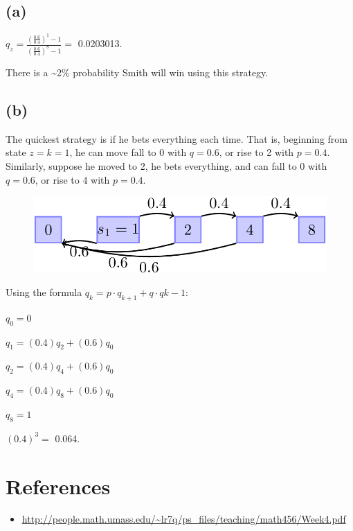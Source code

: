 \documentclass[]{article}
\providecommand{\tightlist}{%
  \setlength{\itemsep}{0pt}\setlength{\parskip}{0pt}}
\begin{document}
\subsection{(a)}\label{a}

\(q_z = \frac{(\frac{0.6}{0.4})^1 - 1}{(\frac{0.6}{0.4})^8 - 1} =\)
0.0203013.

There is a \textasciitilde{}2\% probability Smith will win using this
strategy.

\subsection{(b)}\label{b}

The quickest strategy is if he bets everything each time. That is,
beginning from state \(z = k = 1\), he can move fall to 0 with
\(q = 0.6\), or rise to 2 with \(p = 0.4\). Similarly, suppose he moved
to 2, he bets everything, and can fall to 0 with \(q = 0.6\), or rise to
4 with \(p = 0.4\).

\begin{figure}
\centering
\includegraphics{markov.png}
\caption{}
\end{figure}

Using the formula \(q_k = p\cdot q_{k+1} + q\cdot q{k-1}\):

\(q_0 = 0\)

\(q_1 = (0.4)q_2 + (0.6)q_0\)

\(q_2 = (0.4)q_4 + (0.6)q_0\)

\(q_4 = (0.4)q_8 + (0.6)q_0\)

\(q_8 = 1\)

\((0.4)^3 =\) 0.064.

\section{References}\label{references}

\begin{itemize}
\tightlist
\item
  \url{http://people.math.umass.edu/~lr7q/ps_files/teaching/math456/Week4.pdf}
\end{itemize}
\end{document}
